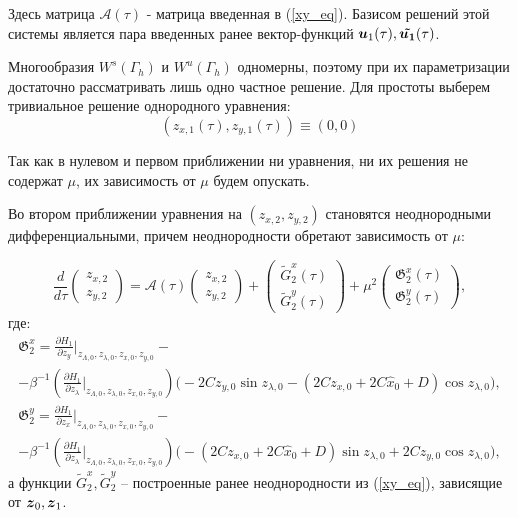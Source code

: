 Здесь матрица $\mathcal{A}(\tau)$ - матрица введенная в (\ref{xy_eq}). Базисом решений этой системы является пара введенных ранее вектор-функций $\boldsymbol{u}_1 (\tau), \boldsymbol{ \tilde{u_1}} (\tau)$.

Многообразия $W^s(\Gamma_h)$ и $W^u(\Gamma_h)$ одномерны, поэтому при их параметризации достаточно рассматривать лишь одно частное решение. Для простоты выберем тривиальное решение однородного уравнения:
$$\left(z_{x,1}(\tau), z_{y,1}(\tau) \right) \equiv (0,0)$$


Так как в нулевом и первом приближении ни уравнения, ни их решения не содержат $\mu$, их зависимость от $\mu$ будем опускать.

Во втором приближении уравнения на $(z_{x,2},z_{y,2})$ становятся неоднородными дифференциальными, причем неоднородности обретают зависимость от $\mu$:

\begin{equation}
\frac{d}{d\tau} \begin{pmatrix} z_{x,2} \\ z_{y,2} \end{pmatrix} = 
\mathcal{A}(\tau) \begin{pmatrix} z_{x,2} \\ z_{y,2} \end{pmatrix} + \begin{pmatrix} \tilde G_2^x(\tau) \\ \tilde G_2^y(\tau) \end{pmatrix} + 
\mu^2 \begin{pmatrix} 
\mathfrak{G}_2^x(\tau) \\ 
\mathfrak{G}_2^y(\tau)
\end{pmatrix},
\label{xy_eq_new}
\end{equation}
где:
\begingroup
\small
\begin{multline*}
\mathfrak{G}_2^x = \frac{\partial H_1}{\partial z_y} \Big|_{z_{\Lambda,0},z_{\lambda,0},z_{x,0},z_{y,0}} - \\ -\beta^{-1} \left(\frac{\partial H_1}{\partial z_\lambda} \Big|_{z_{\Lambda,0},z_{\lambda,0},z_{x,0},z_{y,0}} \right) \big( -2Cz_{y,0} \sin z_{\lambda,0} - (2C z_{x,0}+2C \hat x_0+D) \cos z_{\lambda,0} \big),
\end{multline*}
\begin{multline*}
\mathfrak{G}_2^y = \frac{\partial H_1}{\partial z_x} \Big|_{z_{\Lambda,0},z_{\lambda,0},z_{x,0},z_{y,0}} - \\ -\beta^{-1} \left(\frac{\partial H_1}{\partial z_\lambda} \Big|_{z_{\Lambda,0},z_{\lambda,0},z_{x,0},z_{y,0}} \right) \big( -(2C z_{x,0}+2C \hat x_0+D) \sin z_{\lambda,0} + 2C z_{y,0} \cos z_{\lambda,0} \big),
\end{multline*}
а функции $\tilde G_2^x, \tilde G_2^y$ -- построенные ранее неоднородности из (\ref{xy_eq}), зависящие от $\boldsymbol{z}_0, \boldsymbol{z}_1$.

